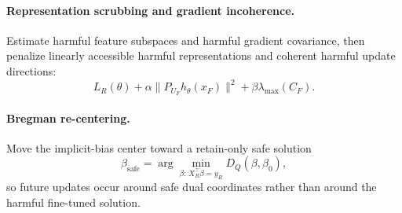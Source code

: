 \documentclass[11pt]{article}
\begin{document}
\paragraph{Representation scrubbing and gradient incoherence.}
Estimate harmful feature subspaces and harmful gradient covariance, then penalize linearly accessible harmful representations and coherent harmful update directions:
\begin{equation}
    L_R(\theta)
    +
    \alpha\|P_{U_F}h_\theta(x_F)\|^2
    +
    \beta\lambda_{\max}(C_F).
\end{equation}

\paragraph{Bregman re-centering.}
Move the implicit-bias center toward a retain-only safe solution
\begin{equation}
    \beta_{\mathrm{safe}}
    =
    \arg\min_{\beta:\,X_R^\top\beta=y_R}
    D_Q(\beta,\beta_0),
\end{equation}
so future updates occur around safe dual coordinates rather than around the harmful fine-tuned solution.
\end{document}
